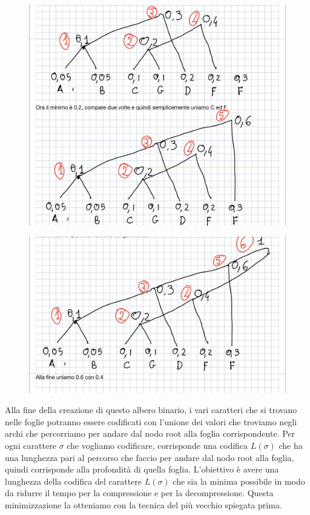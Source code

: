 \documentclass[14pt]{extreport}
\begin{document}
\begin{figure}[H]
\centering
  \includegraphics[width=\linewidth]{IMG_0169.jpg}

\end{figure}

\begin{figure}[H]
\centering
  \includegraphics[width=\linewidth]{IMG_0170.jpg}

\end{figure}

Alla fine della creazione di questo albero binario, i vari caratteri che si trovano nelle foglie potranno essere codificati con l'unione dei valori che troviamo negli archi che percorriamo per andare dal nodo root alla foglia corrispondente.
Per ogni carattere $\sigma$ che vogliamo codificare, corrisponde una codifica $L(\sigma)$ che ha una lunghezza pari al percorso che faccio per andare dal nodo root alla foglia, quindi corrisponde alla profondità di quella foglia.
L'obiettivo è avere una lunghezza della codifica del carattere $L(\sigma)$ che sia la minima possibile in modo da ridurre il tempo per la compressione e per la decompressione. Questa minimizzazione la otteniamo con la tecnica del più vecchio spiegata prima.
\end{document}
